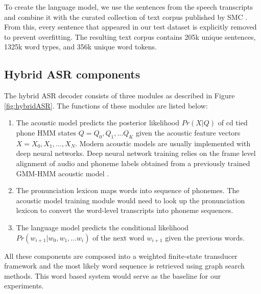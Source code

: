 
To create the language model, we use the sentences from the speech transcripts
and combine it with the curated collection of text corpus published by SMC
\cite{smctext}. From this, every sentence that appeared in our test dataset is
explicitly removed to prevent overfitting. The resulting text corpus contains
205k unique sentences, 1325k word types, and 356k unique word tokens.

\subsection{Hybrid ASR components}

The hybrid ASR decoder consists of three modules as described in Figure
\ref{fig:hybridASR}. The functions of these modules are listed below:

\begin{enumerate}
    \item The acoustic model predicts the posterior likelihood $Pr(X|Q)$ of  \gls{cd} tied phone HMM states $Q = {Q_0, Q_1, ...Q_K }$ given the
    acoustic feature vectors ${X} = {X_0 , X_1, ..., X_N }$. Modern acoustic
          models are usually implemented with deep neural networks. Deep neural network
          training relies on the frame level alignment of audio and phoneme labels
          obtained from a previously trained GMM-HMM acoustic model
          \cite{zelasko2022phoneticinventories}.

    \item The pronunciation lexicon maps words into sequence of phonemes. The acoustic
          model training module would need to look up the pronunciation lexicon to
          convert the word-level transcripts into phoneme sequences.

    \item The language model predicts the conditional likelihood $Pr(w_{i+1}|w_0 , w_1 , ...w_i )$ of the next word $w_{i+1}$ given the previous words.
\end{enumerate}

All these components are composed into a weighted finite-state transducer
framework \cite{MOHRI200269} and the most likely word sequence is retrieved
using graph search methods. This word based system would serve as the baseline
for our experiments.



